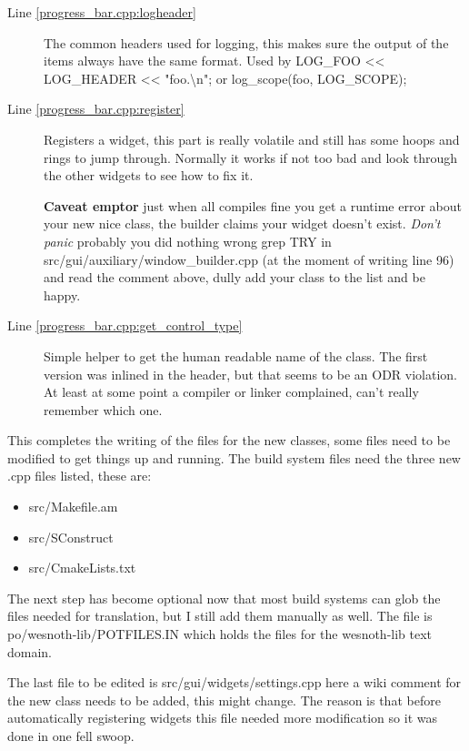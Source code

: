 \begin{description}
\begin{description}
\begin{description}
	\item[Line \ref{progress_bar.cpp:logheader}]
		The common headers used for logging, this makes sure the output of the
		items always have the same format. Used by
		LOG\_FOO \textless\textless{} LOG\_HEADER \textless\textless{} "foo.\textbackslash{}n"; or
		log\_scope(foo, LOG\_SCOPE); %

	\item[Line \ref{progress_bar.cpp:register}]
		Registers a widget, this part is really volatile and still has some
		hoops and rings to jump through. Normally it works if not too bad and
		look through the other widgets to see how to fix it. 

		\textbf{Caveat emptor} just when all compiles fine you get a runtime
		error about your new nice class, the builder claims your widget doesn't
		exist. \emph{Don't panic} probably you did nothing wrong grep TRY in
		src/gui/auxiliary/window\_builder.cpp (at the moment of writing line 96)
		and read the comment above, dully add your class to the list and be
		happy.

	\item[Line \ref{progress_bar.cpp:get_control_type}]
		Simple helper to get the human readable name of the class. The first
		version was inlined in the header, but that seems to be an ODR
		violation. At least at some point a compiler or linker complained, can't
		really remember which one. %

	\end{description}
\end{description}

This completes the writing of the files for the new classes, some files need to
be modified to get things up and running. The build system files need the three
new .cpp files listed, these are:
\begin{itemize}
\item src/Makefile.am
\item src/SConstruct
\item src/CmakeLists.txt
\end{itemize}

The next step has become optional now that most build systems can glob the files
needed for translation, but I still add them manually as well. The file is 
po/wesnoth-lib/POTFILES.IN which holds the files for the wesnoth-lib text
domain.

The last file to be edited is src/gui/widgets/settings.cpp here a wiki comment
for the new class needs to be added, this might change. The reason is that
before automatically registering widgets this file needed more modification so
it was done in one fell swoop.

\end{description}

